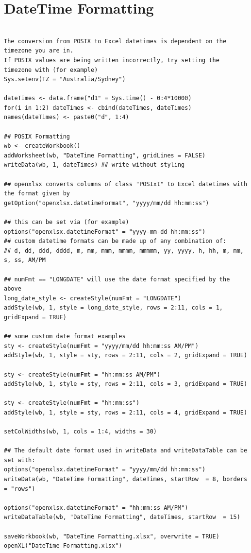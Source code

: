 \documentclass[11pt]{article}\usepackage[]{graphicx}\usepackage[]{color}
\begin{document}
\newpage
\section{DateTime Formatting}
\begin{verbatim}

The conversion from POSIX to Excel datetimes is dependent on the timezone you are in.
If POSIX values are being written incorrectly, try setting the timezone with (for example)
Sys.setenv(TZ = "Australia/Sydney")

dateTimes <- data.frame("d1" = Sys.time() - 0:4*10000)
for(i in 1:2) dateTimes <- cbind(dateTimes, dateTimes)
names(dateTimes) <- paste0("d", 1:4)

## POSIX Formatting
wb <- createWorkbook()
addWorksheet(wb, "DateTime Formatting", gridLines = FALSE)
writeData(wb, 1, dateTimes) ## write without styling

## openxlsx converts columns of class "POSIxt" to Excel datetimes with the format given by
getOption("openxlsx.datetimeFormat", "yyyy/mm/dd hh:mm:ss")

## this can be set via (for example)
options("openxlsx.datetimeFormat" = "yyyy-mm-dd hh:mm:ss")
## custom datetime formats can be made up of any combination of:
## d, dd, ddd, dddd, m, mm, mmm, mmmm, mmmmm, yy, yyyy, h, hh, m, mm, s, ss, AM/PM

## numFmt == "LONGDATE" will use the date format specified by the above
long_date_style <- createStyle(numFmt = "LONGDATE")
addStyle(wb, 1, style = long_date_style, rows = 2:11, cols = 1, gridExpand = TRUE) 

## some custom date format examples
sty <- createStyle(numFmt = "yyyy/mm/dd hh:mm:ss AM/PM")
addStyle(wb, 1, style = sty, rows = 2:11, cols = 2, gridExpand = TRUE)

sty <- createStyle(numFmt = "hh:mm:ss AM/PM")
addStyle(wb, 1, style = sty, rows = 2:11, cols = 3, gridExpand = TRUE)

sty <- createStyle(numFmt = "hh:mm:ss")
addStyle(wb, 1, style = sty, rows = 2:11, cols = 4, gridExpand = TRUE)

setColWidths(wb, 1, cols = 1:4, widths = 30)

## The default date format used in writeData and writeDataTable can be set with:
options("openxlsx.datetimeFormat" = "yyyy/mm/dd hh:mm:ss")
writeData(wb, "DateTime Formatting", dateTimes, startRow  = 8, borders = "rows")

options("openxlsx.datetimeFormat" = "hh:mm:ss AM/PM")
writeDataTable(wb, "DateTime Formatting", dateTimes, startRow  = 15)

saveWorkbook(wb, "DateTime Formatting.xlsx", overwrite = TRUE)
openXL("DateTime Formatting.xlsx")

\end{verbatim}
\end{document}
